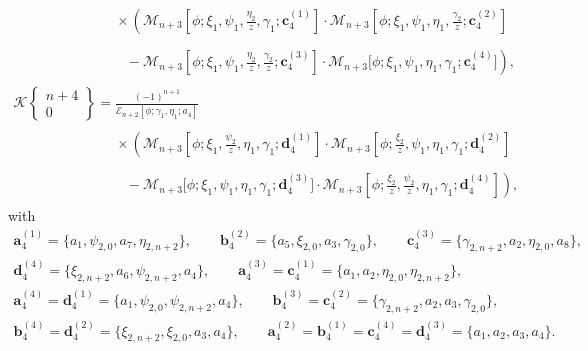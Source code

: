 \documentclass[pdftex]{sigma}
\numberwithin{equation}{section}
\newcommand{\ga}{\gamma}
\begin{document}
\begin{gather*}
\phantom{\mathscr{K}\left\lbrace \begin{matrix} 0 \\ n+4 \end{matrix} \right\rbrace =}{}\times \left( \mathscr{M}_{n+3}\left[\phi; \xi_1, \psi_1, \frac{\eta_2}{z}, \ga_1; \boldsymbol{c}^{(1)}_4\right]\cdot \mathscr{M}_{n+3}\left[\phi; \xi_1, \psi_1, \eta_1, \frac{\ga_2}{z}; \boldsymbol{c}^{(2)}_4\right] \right. \\
 \phantom{\mathscr{K}\left\lbrace \begin{matrix} 0 \\ n+4 \end{matrix} \right\rbrace =\times}{} - \left. \mathscr{M}_{n+3}\left[\phi; \xi_1, \psi_1, \frac{\eta_2}{z},\frac{\ga_2}{z}; \boldsymbol{c}^{(3)}_4\right]\cdot \mathscr{M}_{n+3}\big[\phi; \xi_1, \psi_1, \eta_1, \ga_1; \boldsymbol{c}^{(4)}_4\big] \right),
\\
				\mathscr{K}\left\lbrace \begin{matrix} n+4 \\ 0 \end{matrix} \right\rbrace = \frac{(-1)^{n+1}}{\mathscr{E}_{n+2}[\phi;\ga_1,\eta_1;a_4]} \\
\phantom{\mathscr{K}\left\lbrace \begin{matrix} n+4 \\ 0 \end{matrix} \right\rbrace =}{}\times \left( \mathscr{M}_{n+3}\left[\phi; \xi_1,\frac{\psi_2}{z}, \eta_1, \ga_1; \boldsymbol{d}^{(1)}_4\right]\cdot \mathscr{M}_{n+3}\left[\phi; \frac{\xi_2}{z}, \psi_1, \eta_1, \ga_1; \boldsymbol{d}^{(2)}_4\right] \right. \\
\phantom{\mathscr{K}\left\lbrace \begin{matrix} n+4 \\ 0 \end{matrix} \right\rbrace =\times }{}- \left. \mathscr{M}_{n+3}\big[\phi; \xi_1, \psi_1, \eta_1, \ga_1; \boldsymbol{d}^{(3)}_4\big]\cdot \mathscr{M}_{n+3}\left[\phi; \frac{\xi_2}{z}, \frac{\psi_2}{z}, \eta_1, \ga_1; \boldsymbol{d}^{(4)}_4\right] \right),
		\end{gather*}
		with
		\begin{gather*}
			\boldsymbol{a}^{(1)}_4 = \{a_1, \psi_{2,0}, a_7, \eta_{2,n+2} \},\qquad	 \boldsymbol{b}^{(2)}_4 = \{a_5, \xi_{2,0}, a_3, \ga_{2,0}\}, \qquad		
			\boldsymbol{c}^{(3)}_4 = \{\ga_{2,n+2}, a_2, \eta_{2,0}, a_8\},		\\
	\boldsymbol{d}^{(4)}_4 = \{\xi_{2,n+2},a_6, \psi_{2,n+2}, a_4\},	\qquad
			\boldsymbol{a}^{(3)}_4 = \boldsymbol{c}^{(1)}_4 = \{a_1, a_2, \eta_{2,0}, \eta_{2,n+2}\},\\
 \boldsymbol{a}^{(4)}_4 = \boldsymbol{d}^{(1)}_4 = \{a_1, \psi_{2,0}, \psi_{2,n+2}, a_4\}, \qquad \boldsymbol{b}^{(3)}_4 = \boldsymbol{c}^{(2)}_4 = \{\ga_{2,n+2}, a_2, a_3,\ga_{2,0}\}, \\
 \boldsymbol{b}^{(4)}_4 = 	\boldsymbol{d}^{(2)}_4 = \{\xi_{2,n+2}, \xi_{2,0}, a_3, a_4\}, \qquad
			\boldsymbol{a}^{(2)}_4 = \boldsymbol{b}^{(1)}_4 = \boldsymbol{c}^{(4)}_4 = \boldsymbol{d}^{(3)}_4 = \{a_1, a_2, a_3, a_4\}.
		\end{gather*}
\end{document}
